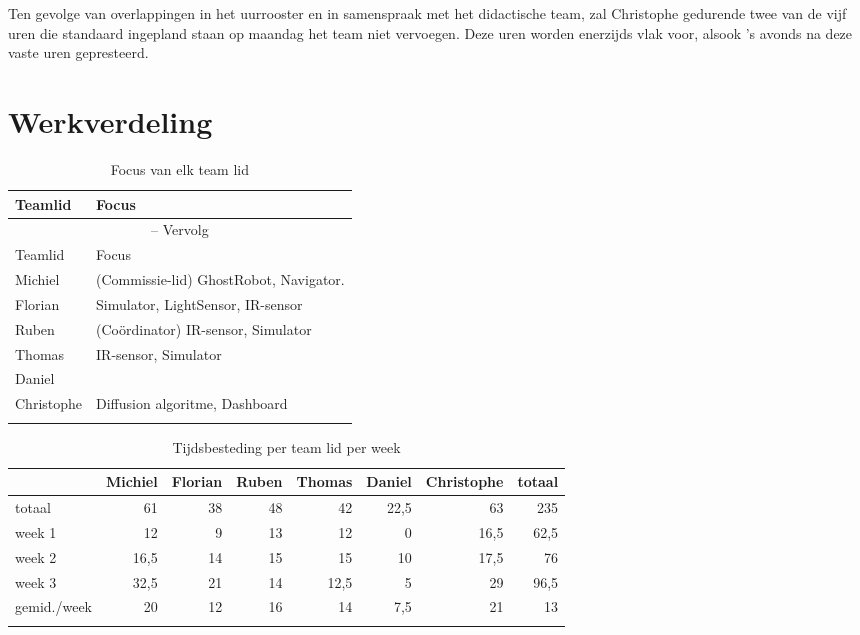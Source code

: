 \documentclass[12pt,a4paper]{report}
\begin{document}
Ten gevolge van overlappingen in het uurrooster en in samenspraak met het didactische team, zal Christophe gedurende twee van de vijf uren die standaard ingepland staan op maandag het team niet vervoegen. Deze uren worden enerzijds vlak voor, alsook 's avonds na deze vaste uren gepresteerd.

\chapter{Werkverdeling}

\begin{longtable}{l l}
\caption{Focus van elk team lid} \\ [0.5ex]
\hline\hline
Teamlid & Focus \\ [0.5ex]
\hline 
\endfirsthead
\multicolumn{2}{c}{{\tablename} \thetable{} -- Vervolg} \\[0.5ex]
\hline \hline
Teamlid & Focus \\ [0.5ex]
\hline 
\endhead
Michiel 		& 	(Commissie-lid) GhostRobot, Navigator. \\
Florian 		&	Simulator, LightSensor, IR-sensor\\
Ruben 		&	(Co\"ordinator) IR-sensor, Simulator\\
Thomas 		&	IR-sensor, Simulator\\
Daniel 		&	\\
Christophe 	&	Diffusion algoritme, Dashboard \\
\hline
\label{tab:focus}
\end{longtable}

\begin{longtable}{l r r r r r r r}
\caption{Tijdsbesteding per team lid per week} \\
\hline\hline
 & Michiel & Florian & Ruben & Thomas & Daniel & Christophe & totaal \\
\hline 
\endfirsthead
totaal & 61 & 38 & 48 & 42 & 22,5 & 63 & 235\\
\hline
week 1 & 12 & 9 & 13 & 12 & 0 & 16,5 & 62,5 \\
week 2 & 16,5 & 14 & 15 & 15 & 10 & 17,5 & 76 \\
week 3 & 32,5 & 21 & 14 & 12,5 & 5 & 29 & 96,5 \\
\hline
gemid./week & 20 & 12 & 16 & 14 & 7,5 & 21 & 13 \\
\label{tab:tijdsregistratie}
\end{longtable}
\end{document}
